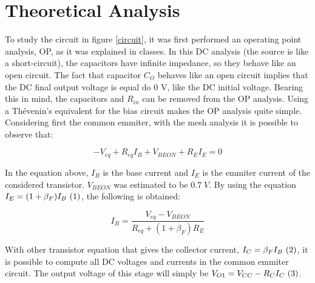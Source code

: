 \newpage
\section{Theoretical Analysis}
\label{sec:analysis}


To study the circuit in figure \ref{circuit}, it was first performed an operating point analysis, OP, as it was explained in classes. In this DC analysis (the source is like a short-circuit), the capacitors have infinite impedance, so they behave like an open circuit. The fact that capacitor $C_O$ behaves like an open circuit implies that the DC final output voltage is equal do 0 V, like the DC initial voltage. Bearing this in mind, the capacitors and $R_{in}$ can be removed from the OP analysis. Using a Thévenin's equivalent for the bias circuit makes the OP analysis quite simple. Considering first the common emmiter, with the mesh analysis it is possible to observe that:

\begin{equation}
        -V_{eq}+R_{eq}I_B+V_{BEON}+R_EI_E = 0
\end{equation}

In the equation above, $I_B$ is the base current and $I_E$ is the emmiter current of the considered transistor. $V_{BEON}$ was estimated to be $0.7\;V$. By using the equation $I_E=(1+\beta_F)I_B ~\refstepcounter{equation}(\theequation) \label{fluxomagnetico}$, the following is obtained:

\begin{equation}
        I_B = \frac{V_{eq}-V_{BEON}}{R_{eq}+(1+\beta_F)R_E}
\end{equation}

With other transistor equation that gives the collector current, $I_C=\beta_FI_B ~\refstepcounter{equation}(\theequation) \label{fluxomagnetico}$, it is possible to compute all DC voltages and currents in the common emmiter circuit. The output voltage of this stage will simply be $V_{O1} = V_{CC}-R_CI_C ~\refstepcounter{equation}(\theequation) \label{fluxomagnetico}$.

